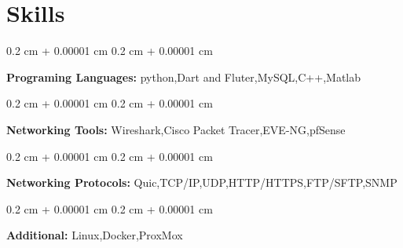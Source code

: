 \documentclass[10pt, letterpaper]{article}
\newenvironment{onecolentry}{
	\begin{adjustwidth}{
			0.2 cm + 0.00001 cm
		}{
			0.2 cm + 0.00001 cm
		}
	}{
	\end{adjustwidth}
} %
\begin{document}
	
	

	
\section{Skills}
	
	\begin{onecolentry}
		\textbf{Programing Languages:} python,Dart and Fluter,MySQL,C++,Matlab
	\end{onecolentry}
	
	\vspace{0.2 cm}
	\begin{onecolentry}
		\textbf{Networking Tools:} Wireshark,Cisco Packet Tracer,EVE-NG,pfSense
	\end{onecolentry}
		\vspace{0.2 cm}
	\begin{onecolentry}
		\textbf{Networking Protocols:} Quic,TCP/IP,UDP,HTTP/HTTPS,FTP/SFTP,SNMP
	\end{onecolentry}
	
	\vspace{0.2 cm}
	\begin{onecolentry}
		\textbf{Additional:} Linux,Docker,ProxMox
	\end{onecolentry}
	
\end{document}
